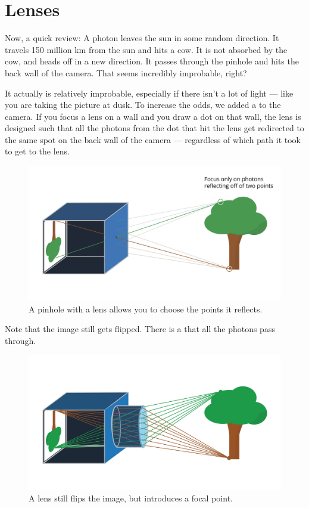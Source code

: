 \section{Lenses}

Now, a quick review: A photon leaves the sun in some random direction. It
travels 150 million km from the sun and hits a cow. It is not
absorbed by the cow, and heads off in a new direction. It passes
through the pinhole and hits the back wall of the camera. That seems
incredibly improbable, right?

It actually is relatively improbable, especially if there isn't a lot of
light --- like you are taking the picture at dusk. To increase the
odds, we added a  to the camera.
If you focus a lens on a wall and you draw a dot on that
wall, the lens is designed such that all the photons from the dot that
hit the lens get redirected to the same spot on the back wall of the
camera --- regardless of which path it took to get to the lens.
\begin{figure}[htbp]
    \centering
    \includegraphics[width=1\textwidth]{pinholePoints.png}
    \caption{A pinhole with a lens allows you to choose the points it reflects.}
    \label{fig:pinholePoints}
\end{figure}



Note that the image still gets flipped. There is a  that all the photons pass through.
\begin{figure}[htbp]
    \centering
    \includegraphics[width=1\textwidth]{lensPoints.png}
    \caption{A lens still flips the image, but introduces a focal point.}
    \label{fig:lensPoints}
\end{figure}

